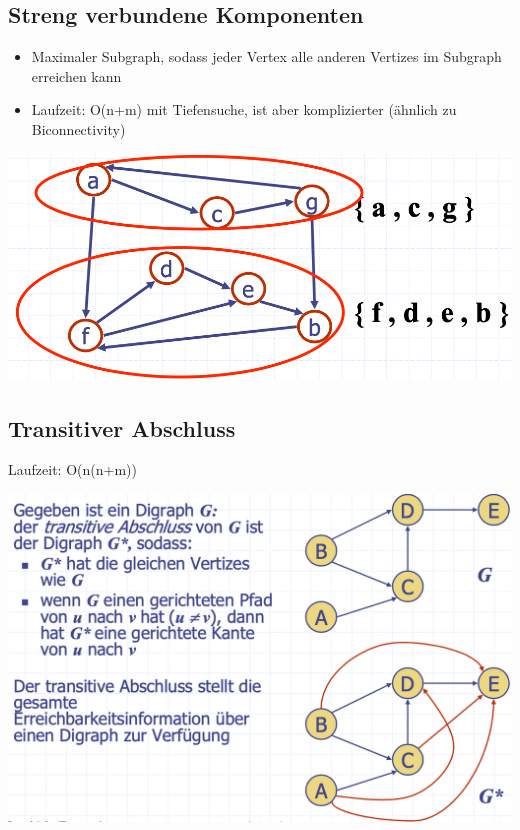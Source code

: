 \subsection{Streng verbundene Komponenten}
\begin{itemize}
    \item Maximaler Subgraph, sodass jeder Vertex alle anderen Vertizes im Subgraph erreichen kann
    \item Laufzeit: O(n+m) mit Tiefensuche, ist aber komplizierter (ähnlich zu Biconnectivity)
\end{itemize}
\vspace{-8pt}
\begin{center}
    \includegraphics[scale=.2]{graphic/14 Digraphs/Streng verbundene Komponenten.png}
\end{center}
\vspace{-8pt}

\subsection{Transitiver Abschluss}
Laufzeit: O(n(n+m))
\vspace{-8pt}
\begin{center}
    \includegraphics[scale=.28]{graphic/14 Digraphs/Transitiver Abschluss.png}
\end{center}
\vspace{-8pt}

